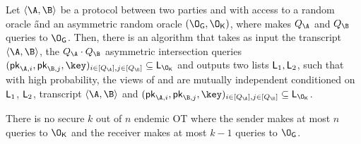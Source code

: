 \begin{lemma}
Let $\langle \A, \B\rangle$ be a protocol between two parties \A and \B with access to a random oracle \H and an asymmetric random oracle $(\OG, \OK)$, where \A makes $Q_{\A}$ and \B $Q_{\B}$ queries to $\OG$. Then, there is an algorithm \E that takes as input the transcript $\langle \A, \B\rangle$, the $Q_{\A}\cdot Q_{\B}$ asymmetric intersection queries $(\pk_{\A,i},\pk_{\B,j},\key)_{i\in[Q_{\A}],j\in[Q_{\B}]}\subseteq\LOK$ and outputs two lists $\mathsf{L}_1, \mathsf{L}_2$, such that with high probability, the views of \A and \B are mutually independent conditioned on $\mathsf{L}_1$, $\mathsf{L}_2$, transcript $\langle \A, \B\rangle$ and $(\pk_{\A,i},\pk_{\B,j},\key)_{i\in[Q_{\A}],j\in[Q_{\B}]}\subseteq\LOK$.
\end{lemma}



\begin{theorem}
There is no secure $k$ out of $n$ endemic OT where the sender makes at most $n$ queries to $\OK$ and the receiver makes at most $k-1$ queries to $\OG$. 
\end{theorem}


